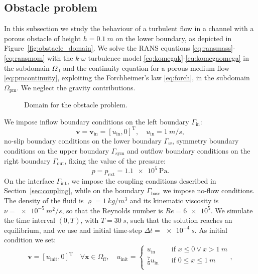 \subsection{Obstacle problem}
In this subsection we study the behaviour of
a turbulent flow in a channel with a porous obstacle of height $h=\SI{0.1}{m}$ on the lower boundary, as depicted in Figure~\ref{fig:obstacle_domain}. We solve the RANS equations \eqref{eq:ransmass}-\eqref{eq:ransmom} with the $k\text{-}\omega$ turbulence model \eqref{eq:komegak}-\eqref{eq:komegaomega} in the subdomain $\Omega_\text{ff}$ and the continuity equation for a porous-medium flow \eqref{eq:pmcontinuity}, exploiting the Forchheimer's law \eqref{eq:forch}, in the subdomain $\Omega_\text{pm}$. We neglect the gravity contributions.
\begin{figure}
	\centering
	\caption[Domain for the obstacle problem]{Domain for the obstacle problem.}
	\label{fig:obstacle domain}
\end{figure}
We impose inflow boundary conditions on the left boundary $\Gamma_\text{in}$:
\begin{equation}
\mathbf{v} = \mathbf{v}_\text{in} = [u_\text{in}, 0]^\mathrm{T}, \quad u_\text{in} = \SI{1}{m/s},
\end{equation}
no-slip boundary conditions on the lower boundary $\Gamma_w$, symmetry boundary conditions on the upper boundary $\Gamma_\text{sym}$ and outflow boundary conditions on the right boundary $\Gamma_\text{out}$, fixing the value of the pressure:
\begin{equation}
	p = p_\text{ext} = \SI{1.1e5}{\pascal}.
\end{equation}
On the interface $\Gamma_\text{int}$, we impose the coupling conditions described in Section~\ref{sec:coupling}, while on the boundary $\Gamma_\text{base}$ we impose no-flow conditions.
The density of the fluid is $\varrho = \SI{1}{kg/m^3}$ and its kinematic viscosity is $\nu=\SI{e-5}{m^2/s}$, so that the Reynolds number is $Re=\num{6e5}$. We simulate the time interval $(0,T) $, with $T=\SI{30}{s}$, such that the solution reaches an equilibrium, and we use and initial time-step $\Delta t = \SI{e-4}{s}$. As initial condition we set:
\begin{equation}
	\mathbf{v} = [u_\text{init}, 0]^\mathrm{T} \quad \forall \mathbf{x} \in \Omega_\text{ff}, \quad u_\text{init} =
	\begin{cases}
	u_\text{in} \quad&\text{if $x\leq 0 \lor x > \SI{1}{m}$}\\
	\frac{7}{6}u_\text{in} \quad&\text{if $0 \leq x \leq \SI{1}{m}$}\\
	\end{cases},
\end{equation}
